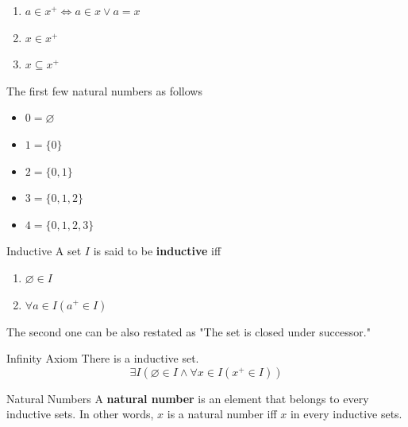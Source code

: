 \begin{proposition}{}{}
    \begin{enumerate}

        \item $a \in x^{+} \iff a \in x \lor a = x$
        \item $x \in x^{+}$
        \item $x \subseteq x^{+}$

    \end{enumerate}
\end{proposition}

\begin{example}
   The first few natural numbers as follows
   \begin{itemize}

       \item $0 = \varnothing$
       \item $1 = \{0\}$
       \item $2 = \{0,1\}$
       \item $3 = \{0,1,2\}$
       \item $4 = \{0,1,2,3\}$

   \end{itemize} 
\end{example}

\begin{definition}{Inductive}{}
    A set $I$ is said to be \textbf{inductive} iff
    \begin{enumerate}

        \item $\varnothing \in I$
        \item $\forall a \in I (a^{+} \in I)$

    \end{enumerate}
    The second one can be also restated as "The set is closed under successor."
\end{definition}

\begin{lemma}{Infinity Axiom}{}
    There is a inductive set.
    \begin{equation*}
        \exists I (\varnothing \in I \land \forall x \in I(x^{+} \in I))
    \end{equation*}
\end{lemma}

\begin{definition}{Natural Numbers}{}
    A \textbf{natural number} is an element that belongs to every
    inductive sets. In other words, $x$ is a natural number iff
    $x$ in every inductive sets.
\end{definition}

